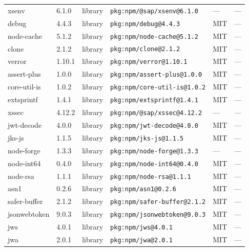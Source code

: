 \documentclass[11pt,a4paper]{article}
\begin{document}
\begin{longtable}{|p{4cm}|p{2cm}|p{1.6cm}|p{5cm}|p{1.5cm}|p{3.5cm}|}
\raggedright xsenv & 6.1.0 & library & \small\texttt{pkg:npm/@sap/xsenv@6.1.0} & — & \small — \\
\raggedright debug & 4.4.3 & library & \small\texttt{pkg:npm/debug@4.4.3} & MIT & \small — \\
\raggedright node-cache & 5.1.2 & library & \small\texttt{pkg:npm/node-cache@5.1.2} & MIT & \small — \\
\raggedright clone & 2.1.2 & library & \small\texttt{pkg:npm/clone@2.1.2} & MIT & \small — \\
\raggedright verror & 1.10.1 & library & \small\texttt{pkg:npm/verror@1.10.1} & MIT & \small — \\
\raggedright assert-plus & 1.0.0 & library & \small\texttt{pkg:npm/assert-plus@1.0.0} & MIT & \small — \\
\raggedright core-util-is & 1.0.2 & library & \small\texttt{pkg:npm/core-util-is@1.0.2} & MIT & \small — \\
\raggedright extsprintf & 1.4.1 & library & \small\texttt{pkg:npm/extsprintf@1.4.1} & MIT & \small — \\
\raggedright xssec & 4.12.2 & library & \small\texttt{pkg:npm/@sap/xssec@4.12.2} & — & \small — \\
\raggedright jwt-decode & 4.0.0 & library & \small\texttt{pkg:npm/jwt-decode@4.0.0} & MIT & \small — \\
\raggedright jks-js & 1.1.5 & library & \small\texttt{pkg:npm/jks-js@1.1.5} & MIT & \small — \\
\raggedright node-forge & 1.3.3 & library & \small\texttt{pkg:npm/node-forge@1.3.3} & — & \small — \\
\raggedright node-int64 & 0.4.0 & library & \small\texttt{pkg:npm/node-int64@0.4.0} & MIT & \small — \\
\raggedright node-rsa & 1.1.1 & library & \small\texttt{pkg:npm/node-rsa@1.1.1} & MIT & \small — \\
\raggedright asn1 & 0.2.6 & library & \small\texttt{pkg:npm/asn1@0.2.6} & MIT & \small — \\
\raggedright safer-buffer & 2.1.2 & library & \small\texttt{pkg:npm/safer-buffer@2.1.2} & MIT & \small — \\
\raggedright jsonwebtoken & 9.0.3 & library & \small\texttt{pkg:npm/jsonwebtoken@9.0.3} & MIT & \small — \\
\raggedright jws & 4.0.1 & library & \small\texttt{pkg:npm/jws@4.0.1} & MIT & \small — \\
\raggedright jwa & 2.0.1 & library & \small\texttt{pkg:npm/jwa@2.0.1} & MIT & \small — \\

\end{longtable}
\end{document}
